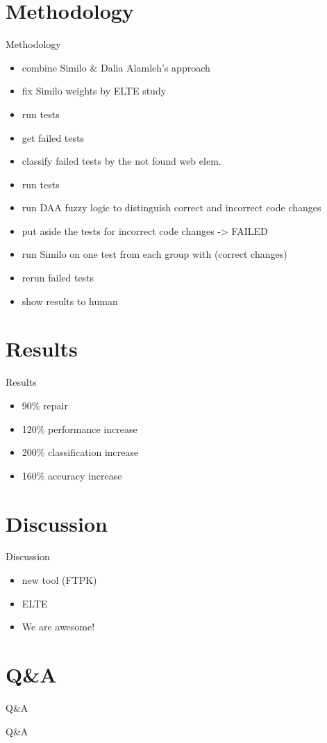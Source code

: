 \documentclass{beamer}
\begin{document}
\section{Methodology}
\begin{frame}{Methodology}
\begin{itemize}
    \item combine Similo \& Dalia Alamleh's approach
    \item fix Similo weights by ELTE study
    \item run tests
    \item get failed tests
    \item classify failed tests by the not found web elem.
    \item run tests
    \item run DAA fuzzy logic to distinguish correct and incorrect code changes 
    \item put aside the tests for incorrect code changes -> FAILED
    \item run Similo on one test from each group with (correct changes)
    \item rerun failed tests
    \item show results to human
\end{itemize}
\end{frame}

\section{Results}
\begin{frame}{Results}
\begin{itemize}
    \item 90\% repair
    \item 120\% performance increase
    \item 200\% classification increase
    \item 160\% accuracy increase
\end{itemize}
\end{frame}

\section{Discussion}
\begin{frame}{Discussion}
\begin{itemize}
    \item new tool (FTPK)
    \item ELTE
    \item We are awesome!
\end{itemize}
\end{frame}

\section{Q\&A}
\begin{frame}{Q\&A}
\begin{center}
\begin{Huge}
    Q\&A
\end{Huge}
\end{center}
\end{frame}
\end{document}
